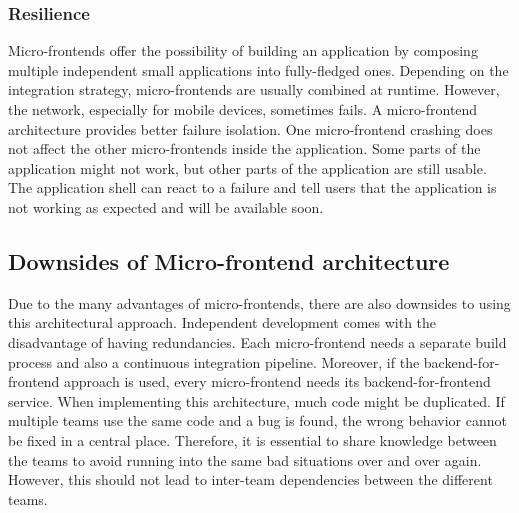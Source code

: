 \subsubsection{Resilience}

Micro-frontends offer the possibility of building an application by composing multiple independent small applications into fully-fledged ones. Depending on the integration strategy, micro-frontends are usually combined at runtime. However, the network, especially for mobile devices, sometimes fails. A micro-frontend architecture provides better failure isolation. One micro-frontend crashing does not affect the other micro-frontends inside the application. Some parts of the application might not work, but other parts of the application are still usable. The application shell can react to a failure and tell users that the application is not working as expected and will be available soon. \cite[10-11]{article:2021:perltonen:background:micro-frontends:motivations-benefits-and-issues}

\subsection{Downsides of Micro-frontend architecture}

Due to the many advantages of micro-frontends, there are also downsides to using this architectural approach. Independent development comes with the disadvantage of having redundancies. Each micro-frontend needs a separate build process and also a continuous integration pipeline. Moreover, if the backend-for-frontend approach is used, every micro-frontend needs its backend-for-frontend service. When implementing this architecture, much code might be duplicated. If multiple teams use the same code and a bug is found, the wrong behavior cannot be fixed in a central place. Therefore, it is essential to share knowledge between the teams to avoid running into the same bad situations over and over again. However, this should not lead to inter-team dependencies between the different teams. \cite[17-18]{book:2020:geers:background:micro-frontends:micro-frontends-in-action}









